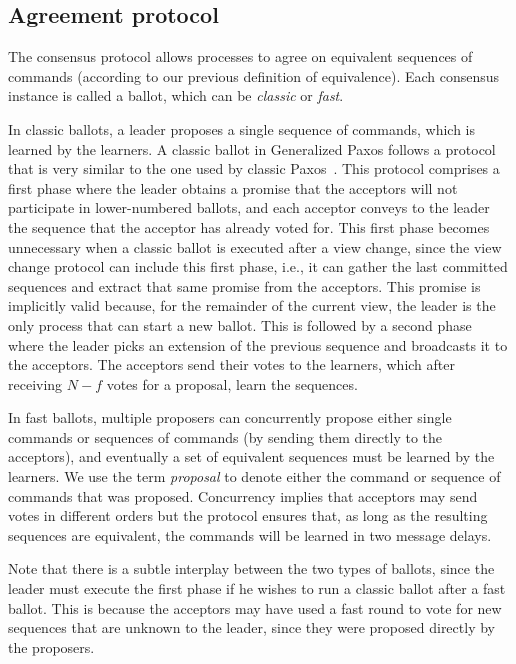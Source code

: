 \subsection{Agreement protocol} 

The consensus protocol allows processes to agree on equivalent sequences of commands (according to our previous definition of equivalence). Each consensus instance is called a ballot, which can be \textit{classic} or \textit{fast}. 

In classic ballots, a leader proposes a single sequence of commands, which is learned by the learners. 
A classic ballot in Generalized Paxos follows a protocol that is very similar to the one used by classic Paxos~\cite{Lam98}. This protocol comprises a first phase where the leader obtains a promise that the acceptors will not participate in lower-numbered ballots, and each acceptor conveys to the leader the sequence that the acceptor has already voted for. This first phase becomes unnecessary when a classic ballot is executed after a view change, since the view change protocol can include this first phase, i.e., it can gather the last committed sequences and extract that same promise from the acceptors. This promise is implicitly valid because, for the remainder of the current view, the leader is the only process that can start a new ballot.  This is followed by a second phase where the leader picks an extension of the previous sequence and broadcasts it to the acceptors. The acceptors send their votes to the learners, which after receiving $N-f$ votes for a proposal, learn the sequences. 

In fast ballots, multiple proposers can concurrently propose either single commands or sequences of commands (by sending them directly to the acceptors), and eventually a set of equivalent sequences must be learned by the learners. We use the term \textit{proposal} to denote either the command or sequence of commands that was proposed.
Concurrency implies that acceptors may send votes in different orders but the protocol ensures that, as long as the resulting sequences are equivalent, the commands will be learned in two message delays. 

 Note that there is a subtle interplay between the two types of ballots, since the leader must execute the first phase if he wishes to run a classic ballot after a fast ballot. This is because the acceptors may have used a fast round to vote for new sequences that are unknown to the leader, since they were proposed directly by the proposers.

